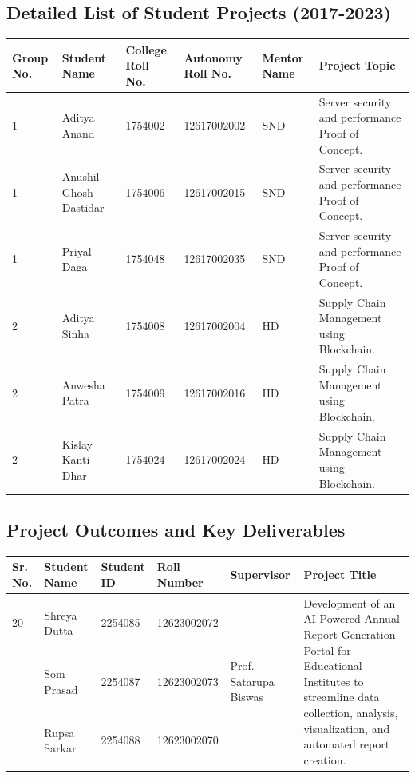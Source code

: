 \documentclass[11pt,a4paper]{article}
\newenvironment{card}{
    \begin{tcolorbox}[
        enhanced,
        colback=cardback,
        colframe=border,
        sharp corners,
        boxrule=0.5pt,
        drop shadow,
        drop shadow={shadow xshift=1mm,shadow yshift=-1mm,fill=border!50},
        boxsep=3mm,
        left=5mm, right=5mm, top=5mm, bottom=5mm,
        width=\textwidth,
        nobeforeafter
    ]
}{\end{tcolorbox}}
\begin{document}
\begin{card}
    \subsection*{\textcolor{accent}{Detailed List of Student Projects (2017-2023)}}
    \vspace{0.3cm}
    \begin{longtable}{@{}p{}p{}p{}p{}p{}p{}@{}}
        \toprule
        \textbf{Group No.} & \textbf{Student Name} & \textbf{College Roll No.} & \textbf{Autonomy Roll No.} & \textbf{Mentor Name} & \textbf{Project Topic} \\
        \midrule
        \endhead
        1 & Aditya Anand & 1754002 & 12617002002 & SND & Server security and performance Proof of Concept. \\
        1 & Anushil Ghosh Dastidar & 1754006 & 12617002015 & SND & Server security and performance Proof of Concept. \\
        1 & Priyal Daga & 1754048 & 12617002035 & SND & Server security and performance Proof of Concept. \\
        2 & Aditya Sinha & 1754008 & 12617002004 & HD & Supply Chain Management using Blockchain. \\
        2 & Anwesha Patra & 1754009 & 12617002016 & HD & Supply Chain Management using Blockchain. \\
        2 & Kislay Kanti Dhar & 1754024 & 12617002024 & HD & Supply Chain Management using Blockchain. \\
        \bottomrule
    \end{longtable}
\end{card}

\vspace{0.5cm}

\begin{card}
    \subsection*{\textcolor{accent}{Project Outcomes and Key Deliverables}}
    \vspace{0.3cm}
    \begin{longtable}{@{}p{}p{}p{}p{}p{}p{}@{}}
        \toprule
        \textbf{Sr. No.} & \textbf{Student Name} & \textbf{Student ID} & \textbf{Roll Number} & \textbf{Supervisor} & \textbf{Project Title} \\
        \midrule
        \endhead
        20 & Shreya Dutta & 2254085 & 12623002072 & \multirow{3}{*}{Prof. Satarupa Biswas} & \multirow{3}{=}{Development of an AI-Powered Annual Report Generation Portal for Educational Institutes to streamline data collection, analysis, visualization, and automated report creation.} \\
        & Som Prasad & 2254087 & 12623002073 & & \\
        & Rupsa Sarkar & 2254088 & 12623002070 & & \\
        \bottomrule
    \end{longtable}
\end{card}
\end{document}
